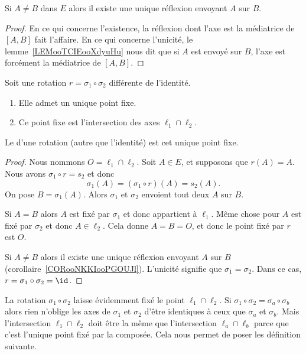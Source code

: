 \begin{corollary}       \label{CORooNKKIooPGOUJl}
    Si \( A\neq B\) dans \( E\) alors il existe une unique réflexion envoyant \( A\) sur \( B\).
\end{corollary}

\begin{proof}
    En ce qui concerne l'existence, la réflexion dont l'axe est la médiatrice de \( [A,B]\) fait l'affaire. En ce qui concerne l'unicité, le lemme~\ref{LEMooTCIEooXdyuHu} nous dit que si \( A\) est envoyé sur \( B\), l'axe est forcément la médiatrice de \( [A,B]\).
\end{proof}

\begin{lemmaDef}        \label{LEMooIJELooLWqBfE}
    Soit une rotation \( r=\sigma_1\circ\sigma_2\) différente de l'identité. 
    \begin{enumerate}
        \item
            Elle admet un unique point fixe.
        \item
            Ce point fixe est l'intersection des axes \( \ell_1\cap\ell_2\).
    \end{enumerate}

    Le  d'une rotation (autre que l'identité) est cet unique point fixe.
\end{lemmaDef}

\begin{proof}
    Nous nommons \( O=\ell_1\cap\ell_2\). Soit \( A\in E\), et supposons que \( r(A)=A\). Nous avons \( \sigma_1\circ r=s_2\) et donc
    \begin{equation}
        \sigma_1(A)=(\sigma_1\circ r)(A)=s_2(A).
    \end{equation}
    On pose \( B=\sigma_1(A)\). Alors \( \sigma_1\) et \( \sigma_2\) envoient tout deux \( A\) sur \( B\).

    Si \( A=B\) alors \( A\) est fixé par \( \sigma_1\) et donc appartient à \( \ell_1\). Même chose pour \( A\) est fixé par \( \sigma_2\) et donc \( A\in\ell_2\). Cela donne \( A=B=O\), et donc le point fixé par \( r\) est \( O\).

    Si \( A\neq B\) alors il existe une unique réflexion envoyant \( A\) sur \( B\) (corollaire~\ref{CORooNKKIooPGOUJl}). L'unicité signifie que \( \sigma_1=\sigma_2\). Dans ce cas, \( r=\sigma_1\circ\sigma_2=\id\).
\end{proof}

\begin{normaltext}      \label{NORMooDPBOooKkRuTn}
    La rotation \( \sigma_1\circ\sigma_2\) laisse évidemment fixé le point \( \ell_1\cap \ell_2\). Si \( \sigma_1\circ\sigma_2=\sigma_a\circ\sigma_b\) alors rien n'oblige les axes de \( \sigma_1\) et \( \sigma_2\) d'être identiques à ceux que \( \sigma_a\) et \( \sigma_b\). Mais l'intersection \( \ell_1\cap\ell_2\) doit être la même que l'intersection \( \ell_a\cap \ell_b\) parce que c'est l'unique point fixé par la composée. Cela nous permet de poser les définition suivante.
\end{normaltext}


